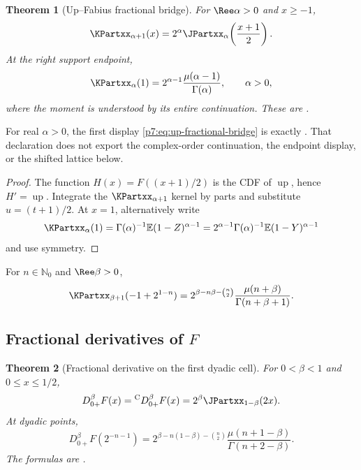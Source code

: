 \documentclass[11pt,oneside]{article}
\newtheorem{theorem}{Theorem}[section]
\theoremstyle{definition}
\theoremstyle{remark}
\newcommand{\Up}{\operatorname{up}}
\newcommand{\E}{\mathbb E}
\newcommand{\N}{\mathbb N}
\newcommand{\1}{\mathbf 1}
\begin{document}
\begin{theorem}[Up--Fabius fractional bridge]
\label{p7:thm:up-fractional-bridge}
For $\Ree\alpha>0$ and $x\ge-1$,
\begin{equation}
 \KPartxx_{\alpha+1}(x)
 =2^\alpha\JPartxx_\alpha\!\left(\frac{x+1}{2}\right).
 \label{p7:eq:up-fractional-bridge}
\end{equation}
At the right support endpoint,
\begin{equation}
 \KPartxx_\alpha(1)
 =2^{\alpha-1}\frac{\mu(\alpha-1)}{\Gamma(\alpha)},
 \qquad \alpha>0,
 \label{p7:eq:up-fractional-endpoint}
\end{equation}
where the moment is understood by its entire continuation.  These are \statusproved.
\end{theorem}

For real \(\alpha>0\), the first display
\eqref{p7:eq:up-fractional-bridge} is exactly
.  That declaration does not export the
complex-order continuation, the endpoint display, or the shifted lattice below.

\begin{proof}
The function $H(x)=F((x+1)/2)$ is the CDF of $\Up$, hence $H'=\Up$.  Integrate the
$\KPartxx_{\alpha+1}$ kernel by parts and substitute $u=(t+1)/2$.  At $x=1$, alternatively write
\[
 \KPartxx_\alpha(1)=\Gamma(\alpha)^{-1}\E(1-Z)^{\alpha-1}
 =2^{\alpha-1}\Gamma(\alpha)^{-1}\E(1-Y)^{\alpha-1}
\]
and use symmetry.
\end{proof}

\begin{corollary}
For $n\in\N_0$ and $\Ree\beta>0$,
\begin{equation}
 \KPartxx_{\beta+1}(-1+2^{1-n})
 =2^{\beta-n\beta-\binom n2}
 \frac{\mu(n+\beta)}{\Gamma(n+\beta+1)}.
 \label{p7:eq:up-fractional-lattice}
\end{equation}
\end{corollary}

\subsection{Fractional derivatives of $F$}

\begin{theorem}[Fractional derivative on the first dyadic cell]
\label{p7:thm:F-fractional-derivative}
For $0<\beta<1$ and $0\le x\le1/2$,
\begin{equation}
 D_{0+}^{\beta}F(x)
 ={}^{\mathrm C}D_{0+}^{\beta}F(x)
 =2^\beta\JPartxx_{1-\beta}(2x).
 \label{p7:eq:F-fractional-derivative}
\end{equation}
At dyadic points,
\begin{equation}
 D_{0+}^{\beta}F(2^{-n-1})
 =2^{\beta-n(1-\beta)-\binom n2}
 \frac{\mu(n+1-\beta)}{\Gamma(n+2-\beta)}.
 \label{p7:eq:F-fractional-derivative-dyadic}
\end{equation}
The formulas are \statusproved.
\end{theorem}
\end{document}
